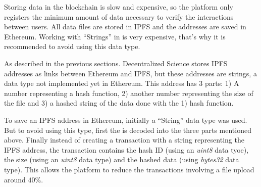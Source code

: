 \begin{itemize}
   Storing data in the
  blockchain is slow and expensive, so the platform only registers the minimum
  amount of data necessary to verify the interactions between users. All data
  files are stored in IPFS and the addresses are saved in Ethereum.  Working with ``Strings'' in  is very
  expensive, that's why it is recommended to avoid using this data type.

  As described in the previous sections. Decentralized Science stores IPFS
  addresses as links between Ethereum and IPFS, but these addresses are
   strings, a data type not implemented yet in Ethereum. This address
  has 3 parts: 1) A number representing a hash function, 2) another number
  representing the size of the file and 3) a hashed string of the data done with
  the 1) hash function.

  To save an IPFS address in Ethereum, initially a ``String'' data type was
  used. But to avoid using this type, first the  is decoded into the
  three parts mentioned above. Finally instead of creating a transaction with a
  string representing the IPFS address, the transaction contains the hash ID
  (using an \emph{uint8} data tyoe), the size (using an \emph{uint8} data type)
  and the hashed data (using \emph{bytes32} data type). This allows the platform
  to reduce the transactions involving a file upload around $40\%$.
\end{itemize}


